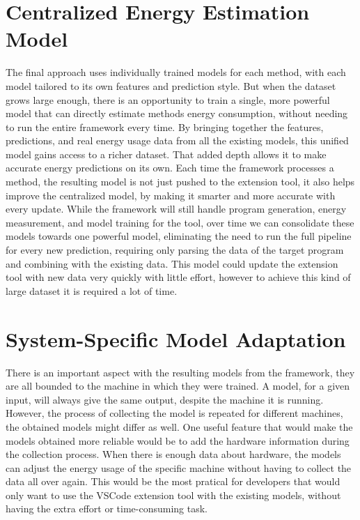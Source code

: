 \section{Centralized Energy Estimation Model} \label{sec:future_work_centralized_energy_estimation_model}

The final approach uses individually trained models for each method, with each model tailored to its own features and prediction style. But when the dataset grows large enough, there is an opportunity to train a single, more powerful model that can directly estimate methods energy consumption, without needing to run the entire framework every time.
By bringing together the features, predictions, and real energy usage data from all the existing models, this unified model gains access to a richer dataset. That added depth allows it to make accurate energy predictions on its own. Each time the framework processes a method, the resulting model is not just pushed to the extension tool, it also helps improve the centralized model, by making it smarter and more accurate with every update.
While the framework will still handle program generation, energy measurement, and model training for the tool, over time we can consolidate these models towards one powerful model, eliminating the need to run the full pipeline for every new prediction, requiring only parsing the data of the target program and combining with the existing data.
This model could update the extension tool with new data very quickly with little effort, however to achieve this kind of large dataset it is required a lot of time.


\section{System-Specific Model Adaptation} \label{sec:future_system_specific_model_adaptation}

There is an important aspect with the resulting models from the framework, they are all bounded to the machine in which they were trained. A model, for a given input, will always give the same output, despite the machine it is running. However, the process of collecting the model is repeated for different machines, the obtained models might differ as well. One useful feature that would make the models obtained more reliable would be to add the hardware information during the collection process. When there is enough data about hardware, the models can adjust the energy usage of the specific machine without having to collect the data all over again. This would be the most pratical for developers that would only want to use the VSCode extension tool with the existing models, without having the extra effort or time-consuming task.














